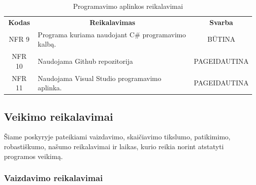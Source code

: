 \documentclass{VUMIFPSkursinis}
\begin{document}
\begin{center}
	\begin{table}[H]
	\caption{Programavimo aplinkos reikalavimai}
	\begin{tabular}{|p{2cm}|p{}|p{}|}
	\hline
	    \rowcolor{lightgray}
		\multicolumn{3}{|c|}{Programavimo aplinkos reikalavimai}\\
		
	\hline
		\multicolumn{1}{|c|}{{\bfseries Kodas}}&
		\multicolumn{1}{|c|}{{\bfseries Reikalavimas}}&
		\multicolumn{1}{|c|}{{\bfseries Svarba}}\\
	\hline 	
		\multicolumn{1}{|c|}{NFR 9}&
		{Programa kuriama naudojant C\# programavimo kalbą.}&
		\multicolumn{1}{|c|}{BŪTINA}\\	
	
	\hline 	
		\multicolumn{1}{|c|}{NFR 10}&
		{Naudojama Github repozitorija }&
		\multicolumn{1}{|p{1.5cm}|}{PAGEIDAUTINA}\\		
	
	\hline 	
		\multicolumn{1}{|c|}{NFR 11}&
		{Naudojama Visual Studio programavimo aplinka.}&
		\multicolumn{1}{|p{1.5cm}|}{PAGEIDAUTINA}\\		
	
	\hline 	 	 	
	\end{tabular}
	
	\label{table:Programavimoaplinkosreikalavimai}
	\end{table}

\end{center}
\pagebreak
\subsection{Veikimo reikalavimai}
Šiame poskyryje pateikiami vaizdavimo, skaičiavimo tikslumo, patikimimo, robastiškumo, našumo reikalavimai ir laikas, kurio reikia norint atstatyti programos veikimą.
\subsubsection{Vaizdavimo reikalavimai}
\end{document}
